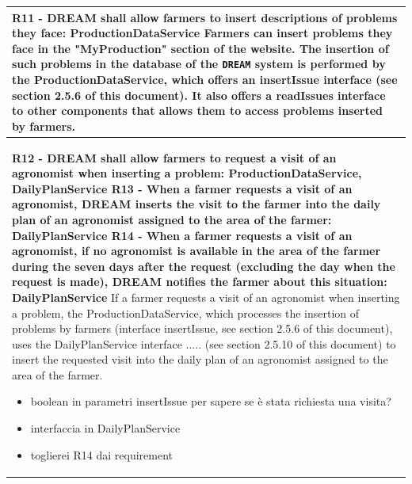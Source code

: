 \documentclass{article}
\begin{document}
\begin{longtable}[c]{|m{11.75cm}|}
    \textbf{R11 - DREAM shall allow farmers to insert descriptions of problems they face: ProductionDataService}
    \newline\newline
    Farmers can insert problems they face in the "MyProduction" section of the website. The insertion of such problems in the database of the \verb|DREAM| system is performed by the ProductionDataService, which offers an insertIssue interface (see section 2.5.6 of this document). It also offers a readIssues interface to other components that allows them to access problems inserted by farmers. \\
    \hline
    
    \textbf{R12 - DREAM shall allow farmers to request a visit of an agronomist when inserting a problem: ProductionDataService, DailyPlanService
    \newline\newline
    R13 - When a farmer requests a visit of an agronomist, DREAM inserts the visit to the farmer into the daily plan of an agronomist assigned to the area of the farmer: DailyPlanService
    \newline\newline
    R14 - When a farmer requests a visit of an agronomist, if no agronomist is available in the area of the farmer during the seven days after the request (excluding the day when the request is made), DREAM notifies the farmer about this situation: DailyPlanService}
    \newline\newline
    If a farmer requests a visit of an agronomist when inserting a problem, the ProductionDataService, which processes the insertion of problems by farmers (interface insertIssue, see section 2.5.6 of this document), uses the DailyPlanService interface ..... (see section 2.5.10 of this document) to insert the requested visit into the daily plan of an agronomist assigned to the area of the farmer.
    \color{red}
    \begin{itemize}
        \item boolean in parametri insertIssue per sapere se è stata richiesta una visita?
        \item interfaccia in DailyPlanService
        \item toglierei R14 dai requirement
    \end{itemize}
    \color{black} \\
    \hline
    

\end{longtable}
\end{document}
